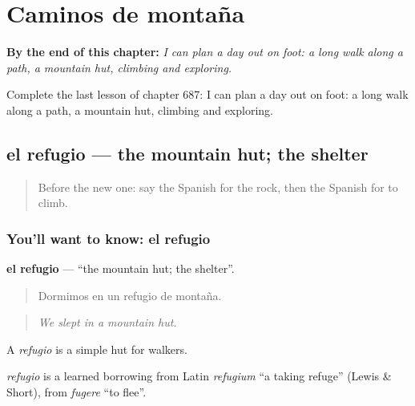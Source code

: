 
\chapter{Caminos de montaña}
\label{ch:es-caminos-de-montana}

\begin{chapteropening}
\textbf{By the end of this chapter:} \emph{I can plan a day out on foot: a long walk along a path, a mountain hut, climbing and exploring.}

Complete the last lesson of chapter 687: I can plan a day out on foot: a long walk along a path, a mountain hut, climbing and exploring.
\end{chapteropening}

\section[el refugio]{el refugio — the mountain hut; the shelter}

\label{lesson:ES-C687-refugio}



\begin{quote}
Before the new one: say the Spanish for the rock, then the Spanish for to climb.
\end{quote}

\subsection*{You'll want to know: el refugio}
\textbf{el refugio} — \textquotedblleft{}the mountain hut; the shelter\textquotedblright{}.

\begin{quote}
Dormimos en un refugio de montaña.
\end{quote}

\begin{quote}
\emph{We slept in a mountain hut.}
\end{quote}

A \emph{refugio} is a simple hut for walkers.

\begin{cousinweb}
\emph{refugio} is a learned borrowing from Latin \emph{refugium} \textquotedblleft{}a taking refuge\textquotedblright{} (Lewis \& Short), from \emph{fugere} \textquotedblleft{}to flee\textquotedblright{}.
\end{cousinweb}

